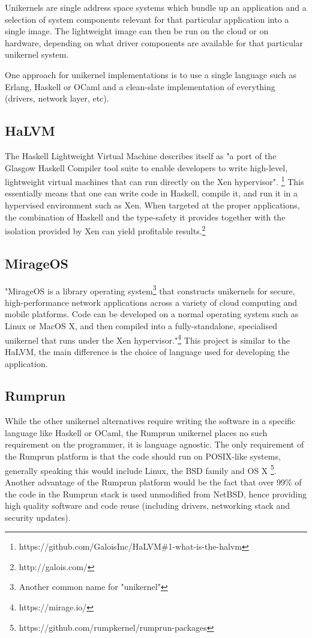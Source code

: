 \documentclass[10pt,a4paper,twoside]{article}
\begin{document}
Unikernels are single address space systems which bundle up an application and a
selection of system components relevant for that particular application into a single image.
The lightweight image can then be run on the cloud or on hardware, depending on what driver
components are available for that particular unikernel system.

One approach for unikernel implementations is to use a single language such as Erlang, Haskell or OCaml
and a clean-slate implementation of everything (drivers, network layer, etc).\cite{RumpComparison}

\subsection{HaLVM}

The Haskell Lightweight Virtual Machine describes itself as
"a port of the Glasgow Haskell Compiler tool suite to enable developers to write high-level,
lightweight virtual machines that can run directly on the Xen hypervisor".
\footnote{https://github.com/GaloisInc/HaLVM\#1-what-is-the-halvm}
This essentially means that one can write code in Haskell, compile it, and run it in a hypervised environment
such as Xen. When targeted at the proper applications, the combination of Haskell and the type-safety it provides
together with the isolation provided by Xen can yield profitable results.\footnote{http://galois.com/}

\subsection{MirageOS}
"MirageOS is a library operating system\footnote{Another common name for "unikernel"} that constructs unikernels
for secure, high-performance network applications across a variety of cloud computing and mobile platforms.
Code can be developed on a normal operating system such as Linux or MacOS X, and then compiled into a
fully-standalone, specialised unikernel that runs under the Xen hypervisor."\footnote{https://mirage.io/}
 This project is similar to the HaLVM, the main difference is the choice of language used for developing
 the application.

\subsection{Rumprun}
While the other unikernel alternatives require writing the software in a specific language like Haskell or
OCaml, the Rumprun unikernel places no such requirement on the programmer, it is language agnostic.
 The only requirement of the Rumprun platform is that the code should run on POSIX-like systems,
 generally speaking this would include Linux, the BSD family and OS X
 \footnote{https://github.com/rumpkernel/rumprun-packages}. Another advantage of the
 Rumprun platform would be the fact that over 99\% of the code in the Rumprun stack is
 used unmodified from NetBSD, hence providing high quality software and code reuse
 (including drivers, networking stack and security updates).\cite{RumpComparison}
\end{document}
